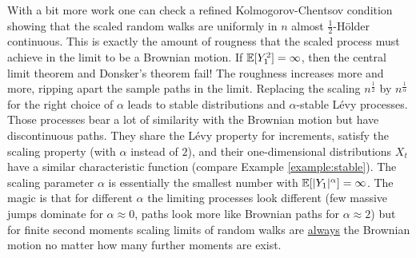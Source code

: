 With a bit more work one can check a refined Kolmogorov-Chentsov condition showing that the scaled random walks are uniformly in $n$ almost $\frac{1}{2}$-H\"older continuous. This is exactly the amount of rougness that the scaled process must achieve in the limit to be a Brownian motion. If $\mathbb{E}[Y_1^2]=\infty$, then the central limit theorem and Donsker's theorem fail! The roughness increases more and more, ripping apart the sample paths in the limit. Replacing the scaling $n^{\frac{1}{2}}$ by $n^{\frac{1}{\alpha}}$ for the right choice of $\alpha$ leads to stable distributions and $\alpha$-stable L\'evy processes. Those processes bear a lot of similarity with the Brownian motion but have discontinuous paths. They share the L\'evy property for increments, satisfy the scaling property (with $\alpha$ instead of $2$), and their one-dimensional distributions $X_t$ have a similar characteristic function (compare Example \ref{example:stable}). The scaling parameter $\alpha$ is essentially the smallest number with $\mathbb{E}[|Y_1|^\alpha]=\infty$. The magic is that for different $\alpha$ the limiting processes look different (few massive jumps dominate for $\alpha \approx 0$, paths look more like Brownian paths for $\alpha\approx 2$) but for finite second moments scaling limits of random walks are \underline{always} the Brownian motion no matter how many further moments are exist.\smallskip


